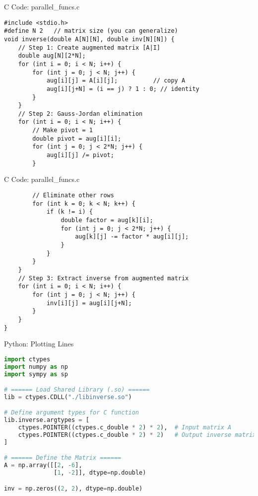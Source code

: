 \documentclass{beamer}
\begin{document}
\begin{frame}[fragile]{C Code: parallel\_funcs.c}
\begin{lstlisting}
#include <stdio.h>
#define N 2   // matrix size (you can generalize)
void inverse(double A[N][N], double inv[N][N]) {
    // Step 1: Create augmented matrix [A|I]
    double aug[N][2*N];
    for (int i = 0; i < N; i++) {
        for (int j = 0; j < N; j++) {
            aug[i][j] = A[i][j];          // copy A
            aug[i][j+N] = (i == j) ? 1 : 0; // identity
        }
    }
    // Step 2: Gauss-Jordan elimination
    for (int i = 0; i < N; i++) {
        // Make pivot = 1
        double pivot = aug[i][i];
        for (int j = 0; j < 2*N; j++) {
            aug[i][j] /= pivot;
        }

\end{lstlisting}
\end{frame}
\begin{frame}[fragile]{C Code: parallel\_funcs.c}
\begin{lstlisting}
        // Eliminate other rows
        for (int k = 0; k < N; k++) {
            if (k != i) {
                double factor = aug[k][i];
                for (int j = 0; j < 2*N; j++) {
                    aug[k][j] -= factor * aug[i][j];
                }
            }
        }
    }
    // Step 3: Extract inverse from augmented matrix
    for (int i = 0; i < N; i++) {
        for (int j = 0; j < N; j++) {
            inv[i][j] = aug[i][j+N];
        }
    }
}
\end{lstlisting}
\end{frame}
\begin{frame}[fragile]{Python: Plotting Lines}
\begin{lstlisting}[language=Python, basicstyle=\ttfamily\scriptsize, keywordstyle=\color{blue}]
import ctypes
import numpy as np
import sympy as sp

# ====== Load Shared Library (.so) ======
lib = ctypes.CDLL("./libinverse.so")

# Define argument types for C function
lib.inverse.argtypes = [
    ctypes.POINTER((ctypes.c_double * 2) * 2),  # Input matrix A
    ctypes.POINTER((ctypes.c_double * 2) * 2)   # Output inverse matrix
]

# ====== Define the Matrix ======
A = np.array([[2, -6],
              [1, -2]], dtype=np.double)

inv = np.zeros((2, 2), dtype=np.double)

\end{lstlisting}
\end{frame}
\end{document}
